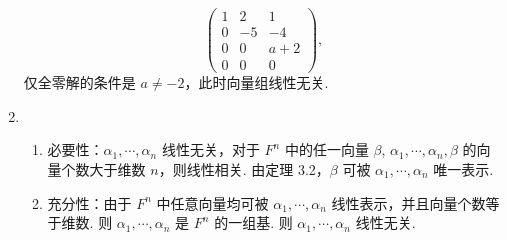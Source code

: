 \begin{enumerate}
\[\begin{pmatrix}
		1 & 2 & 1\\
		0 & -5 & -4\\
		0 & 0 & a+2\\
		0 & 0 & 0
	\end{pmatrix},\]
	仅全零解的条件是 $a\ne-2$，此时向量组线性无关.
    \item \begin{enumerate}
        \item 必要性：$\alpha_1,\cdots,\alpha_n$ 线性无关，对于 $F^n$ 中的任一向量 $\beta$, $\alpha_1,\cdots,\alpha_n,\beta$ 的向量个数大于维数 $n$，则线性相关. 由定理 3.2，$\beta$ 可被 $\alpha_1,\cdots,\alpha_n$ 唯一表示.
        \item 充分性：由于 $F^n$ 中任意向量均可被 $\alpha_1,\cdots,\alpha_n$ 线性表示，并且向量个数等于维数. 则 $\alpha_1,\cdots,\alpha_n$ 是 $F^n$ 的一组基. 则 $\alpha_1,\cdots,\alpha_n$ 线性无关.


\end{enumerate}
\end{enumerate}
